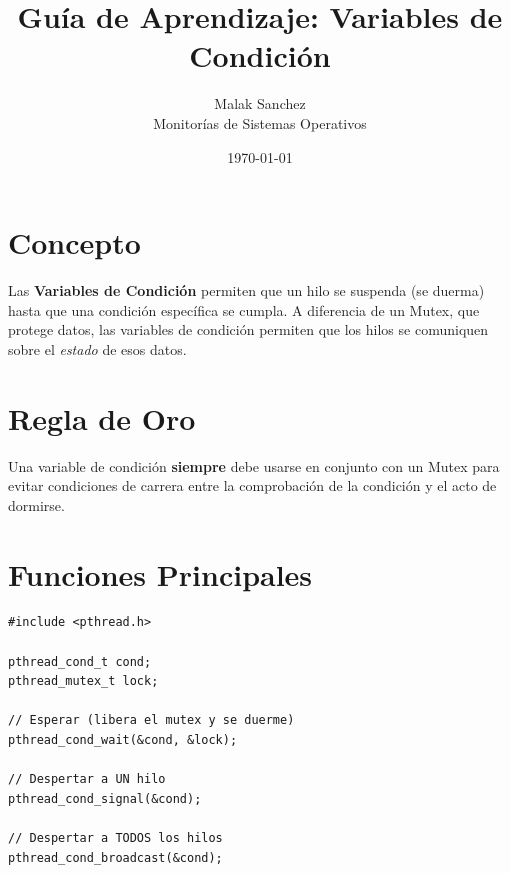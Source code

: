\documentclass[12pt,a4paper]{article}
\title{\textbf{Guía de Aprendizaje: Variables de Condición}}
\author{Malak Sanchez \\ \small Monitorías de Sistemas Operativos}
\date{\today}
\begin{document}
\maketitle

\section{Concepto}
Las \textbf{Variables de Condición} permiten que un hilo se suspenda (se duerma) hasta que una condición específica se cumpla. A diferencia de un Mutex, que protege datos, las variables de condición permiten que los hilos se comuniquen sobre el \textit{estado} de esos datos.

\section{Regla de Oro}
Una variable de condición \textbf{siempre} debe usarse en conjunto con un Mutex para evitar condiciones de carrera entre la comprobación de la condición y el acto de dormirse.

\begin{center}
\end{center}

\newpage

\section{Funciones Principales}
\begin{lstlisting}[numbers=none]
#include <pthread.h>

pthread_cond_t cond;
pthread_mutex_t lock;

// Esperar (libera el mutex y se duerme)
pthread_cond_wait(&cond, &lock);

// Despertar a UN hilo
pthread_cond_signal(&cond);

// Despertar a TODOS los hilos
pthread_cond_broadcast(&cond);
\end{lstlisting}
\end{document}

